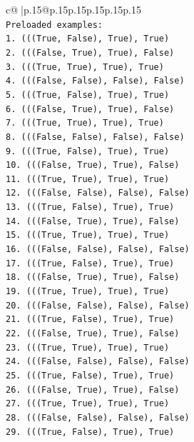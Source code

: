 \documentclass{article}
\begin{document}
{\begin{supertabular}{c@{$\;$}|p{.15\linewidth}@{}p{.15\linewidth}p{.15\linewidth}p{.15\linewidth}p{.15\linewidth}p{.15\linewidth}}
{{{\\ 
\texttt{Preloaded examples:} \\
\texttt{1. (((True, False), True), True)} \\
\texttt{2. (((False, True), True), False)} \\
\texttt{3. (((True, True), True), True)} \\
\texttt{4. (((False, False), False), False)} \\
\texttt{5. (((True, False), True), True)} \\
\texttt{6. (((False, True), True), False)} \\
\texttt{7. (((True, True), True), True)} \\
\texttt{8. (((False, False), False), False)} \\
\texttt{9. (((True, False), True), True)} \\
\texttt{10. (((False, True), True), False)} \\
\texttt{11. (((True, True), True), True)} \\
\texttt{12. (((False, False), False), False)} \\
\texttt{13. (((True, False), True), True)} \\
\texttt{14. (((False, True), True), False)} \\
\texttt{15. (((True, True), True), True)} \\
\texttt{16. (((False, False), False), False)} \\
\texttt{17. (((True, False), True), True)} \\
\texttt{18. (((False, True), True), False)} \\
\texttt{19. (((True, True), True), True)} \\
\texttt{20. (((False, False), False), False)} \\
\texttt{21. (((True, False), True), True)} \\
\texttt{22. (((False, True), True), False)} \\
\texttt{23. (((True, True), True), True)} \\
\texttt{24. (((False, False), False), False)} \\
\texttt{25. (((True, False), True), True)} \\
\texttt{26. (((False, True), True), False)} \\
\texttt{27. (((True, True), True), True)} \\
\texttt{28. (((False, False), False), False)} \\
\texttt{29. (((True, False), True), True)} \\
}}}
\end{supertabular}}
\end{document}
